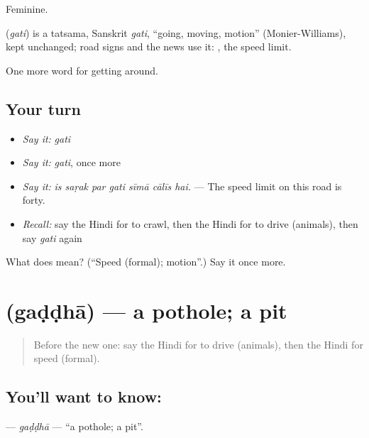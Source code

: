 Feminine.

\begin{cousinweb}
\textbf{} (\emph{gati}) is a tatsama, Sanskrit \emph{gati}, \textquotedblleft{}going, moving, motion\textquotedblright{} (Monier-Williams), kept unchanged; road signs and the news use it:  , the speed limit.
\end{cousinweb}

\begin{grammarlens}[title={What you've built}]
One more word for getting around.
\end{grammarlens}

\subsection*{Your turn}
\begin{itemize}
\raggedright
  \item \emph{Say it:} \emph{gati}
  \item \emph{Say it:} \emph{gati}, once more
  \item \emph{Say it:} \emph{is saṛak par gati sīmā cālīs hai.} — The speed limit on this road is forty.
  \item \emph{Recall:} say the Hindi for to crawl, then the Hindi for to drive (animals), then say \emph{gati} again
\end{itemize}

\begin{tcolorbox}[breakable,colback=teal!4,colframe=teal!35!black,title={Before you move on}]
What does  mean? (\textquotedblleft{}Speed (formal); motion\textquotedblright{}.) Say it once more.
\end{tcolorbox}
\section[\texorpdfstring{\hi{गड्ढा} (gaḍḍhā)}{गड्ढा (gaḍḍhā)}]{ (gaḍḍhā) — a pothole; a pit}

\label{lesson:HI-C405-gaddha}



\begin{quote}
Before the new one: say the Hindi for to drive (animals), then the Hindi for speed (formal).
\end{quote}

\subsection*{You'll want to know: }
\textbf{} — \emph{gaḍḍhā} — \textquotedblleft{}a pothole; a pit\textquotedblright{}.

